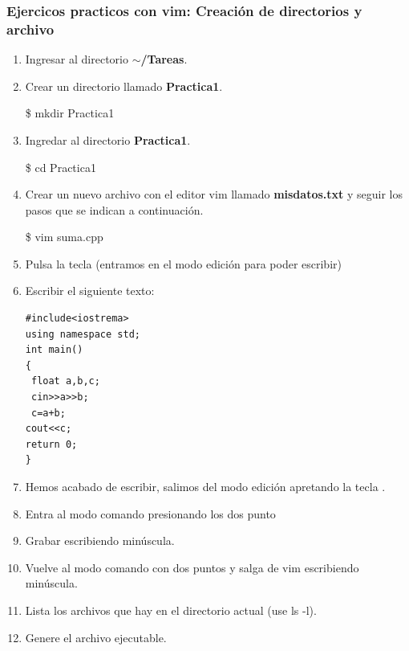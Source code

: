\documentclass[a4paper,12pt,spanish]{article}
\begin{document}
\subsubsection{Ejercicos practicos con vim: Creación de directorios y archivo}
\label{sec:ejerc-pract-con}


\begin{enumerate}
  \item Ingresar al directorio \textbf{$\sim$/Tareas}.
  \item  Crear un directorio llamado \textbf{Practica1}.
    \begin{tcolorbox}[colback=gray!5]
    \$ mkdir Practica1
  \end{tcolorbox}

  \item Ingredar al directorio \textbf{Practica1}.
    \begin{tcolorbox}[colback=gray!5]
    \$ cd Practica1
  \end{tcolorbox}

  \item Crear un nuevo archivo con el editor vim llamado \textbf{misdatos.txt}
  y seguir los pasos que se indican a continuación.
    \begin{tcolorbox}[colback=gray!5]
    \$ vim suma.cpp
  \end{tcolorbox}
  
  \item Pulsa la tecla  (entramos en el modo edición para poder
  escribir)
  \item Escribir el siguiente texto:
\begin{verbatim}
#include<iostrema>
using namespace std;
int main()
{
 float a,b,c;
 cin>>a>>b;
 c=a+b;
cout<<c;
return 0;
}
\end{verbatim}

  \item Hemos acabado de escribir, salimos del modo edición apretando
  la tecla .
  \item Entra al modo comando presionando los dos punto
  \fbox{\Large :}
\item Grabar escribiendo  minúscula.

  
  \item Vuelve al modo comando con dos puntos \fbox{\Large :} y salga
  de vim escribiendo  minúscula.
  \item Lista los archivos que hay en el directorio actual (use ls
  -l).

  \item Genere el archivo ejecutable.


\end{enumerate}
\end{document}
